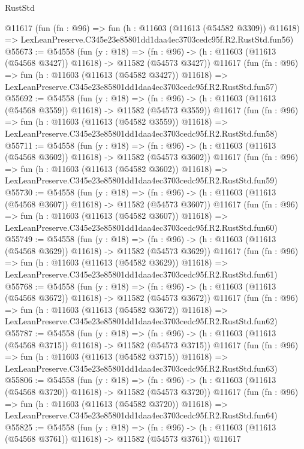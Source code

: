 \begin{lexlean}{RustStd}
\begin{coremodule}
    @11617
    (fun (fn : @96) =>
    fun (h : @11603 (@11613 (@54582 @3309)) @11618) =>
    LexLeanPreserve.C345e23e85801dd1daa4ec3703cedc95f.R2.RustStd.fun56)
@55673 := @54558
    (fun (y : @18) =>
    (fn : @96) -> (h : @11603 (@11613 (@54568 @3427)) @11618) -> @11582 (@54573 @3427))
    @11617
    (fun (fn : @96) =>
    fun (h : @11603 (@11613 (@54582 @3427)) @11618) =>
    LexLeanPreserve.C345e23e85801dd1daa4ec3703cedc95f.R2.RustStd.fun57)
@55692 := @54558
    (fun (y : @18) =>
    (fn : @96) -> (h : @11603 (@11613 (@54568 @3559)) @11618) -> @11582 (@54573 @3559))
    @11617
    (fun (fn : @96) =>
    fun (h : @11603 (@11613 (@54582 @3559)) @11618) =>
    LexLeanPreserve.C345e23e85801dd1daa4ec3703cedc95f.R2.RustStd.fun58)
@55711 := @54558
    (fun (y : @18) =>
    (fn : @96) -> (h : @11603 (@11613 (@54568 @3602)) @11618) -> @11582 (@54573 @3602))
    @11617
    (fun (fn : @96) =>
    fun (h : @11603 (@11613 (@54582 @3602)) @11618) =>
    LexLeanPreserve.C345e23e85801dd1daa4ec3703cedc95f.R2.RustStd.fun59)
@55730 := @54558
    (fun (y : @18) =>
    (fn : @96) -> (h : @11603 (@11613 (@54568 @3607)) @11618) -> @11582 (@54573 @3607))
    @11617
    (fun (fn : @96) =>
    fun (h : @11603 (@11613 (@54582 @3607)) @11618) =>
    LexLeanPreserve.C345e23e85801dd1daa4ec3703cedc95f.R2.RustStd.fun60)
@55749 := @54558
    (fun (y : @18) =>
    (fn : @96) -> (h : @11603 (@11613 (@54568 @3629)) @11618) -> @11582 (@54573 @3629))
    @11617
    (fun (fn : @96) =>
    fun (h : @11603 (@11613 (@54582 @3629)) @11618) =>
    LexLeanPreserve.C345e23e85801dd1daa4ec3703cedc95f.R2.RustStd.fun61)
@55768 := @54558
    (fun (y : @18) =>
    (fn : @96) -> (h : @11603 (@11613 (@54568 @3672)) @11618) -> @11582 (@54573 @3672))
    @11617
    (fun (fn : @96) =>
    fun (h : @11603 (@11613 (@54582 @3672)) @11618) =>
    LexLeanPreserve.C345e23e85801dd1daa4ec3703cedc95f.R2.RustStd.fun62)
@55787 := @54558
    (fun (y : @18) =>
    (fn : @96) -> (h : @11603 (@11613 (@54568 @3715)) @11618) -> @11582 (@54573 @3715))
    @11617
    (fun (fn : @96) =>
    fun (h : @11603 (@11613 (@54582 @3715)) @11618) =>
    LexLeanPreserve.C345e23e85801dd1daa4ec3703cedc95f.R2.RustStd.fun63)
@55806 := @54558
    (fun (y : @18) =>
    (fn : @96) -> (h : @11603 (@11613 (@54568 @3720)) @11618) -> @11582 (@54573 @3720))
    @11617
    (fun (fn : @96) =>
    fun (h : @11603 (@11613 (@54582 @3720)) @11618) =>
    LexLeanPreserve.C345e23e85801dd1daa4ec3703cedc95f.R2.RustStd.fun64)
@55825 := @54558
    (fun (y : @18) =>
    (fn : @96) -> (h : @11603 (@11613 (@54568 @3761)) @11618) -> @11582 (@54573 @3761))
    @11617

\end{coremodule}
\end{lexlean}
